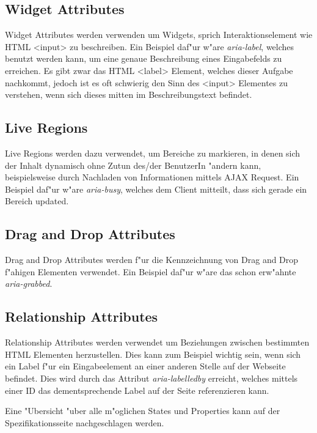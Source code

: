 \documentclass[a4paper,bibtotoc,oneside]{scrbook}
\begin{document}
\subsection{Widget Attributes}
Widget Attributes werden verwenden um Widgets, sprich Interaktionselement wie HTML <input> zu beschreiben. Ein Beispiel daf"ur w"are \emph{aria-label}, welches benutzt werden kann, um eine genaue Beschreibung eines Eingabefelds zu erreichen. Es gibt zwar das HTML <label> Element, welches dieser Aufgabe nachkommt, jedoch ist es oft schwierig den Sinn des <input> Elementes zu verstehen, wenn sich dieses mitten im Beschreibungstext befindet. \cite[Abschnitt 6.6, aria-label]{aria_states}

\subsection{Live Regions}
Live Regions werden dazu verwendet, um Bereiche zu markieren, in denen sich der Inhalt dynamisch ohne Zutun des/der BenutzerIn "andern kann, beispielsweise durch Nachladen von Informationen mittels AJAX Request. Ein Beispiel daf"ur w"are \emph{aria-busy}, welches dem Client mitteilt, dass sich gerade ein Bereich updated. \cite[Abschnitt 6.6, aria-busy]{aria_states}

\subsection{Drag and Drop Attributes}
Drag and Drop Attributes werden f"ur die Kennzeichnung von Drag and Drop f"ahigen Elementen verwendet. Ein Beispiel daf"ur w"are das schon erw"ahnte \emph{aria-grabbed}. \cite[Abschnitt 6.6, aria-grabbed]{aria_states}

\subsection{Relationship Attributes}
Relationship Attributes werden verwendet um Beziehungen zwischen bestimmten HTML Elementen herzustellen. Dies kann zum Beispiel wichtig sein, wenn sich ein Label f"ur ein Eingabeelement an einer anderen Stelle auf der Webseite befindet. Dies wird durch das Attribut \emph{aria-labelledby} erreicht, welches mittels einer ID das dementsprechende Label auf der Seite referenzieren kann. \cite[Abschnitt 6.6, aria-labelledby]{aria_states}

Eine "Ubersicht "uber alle m"oglichen States und Properties kann auf der Spezifikationsseite nachgeschlagen werden. \cite[Abschnitt 6.6]{aria_states}
\end{document}
